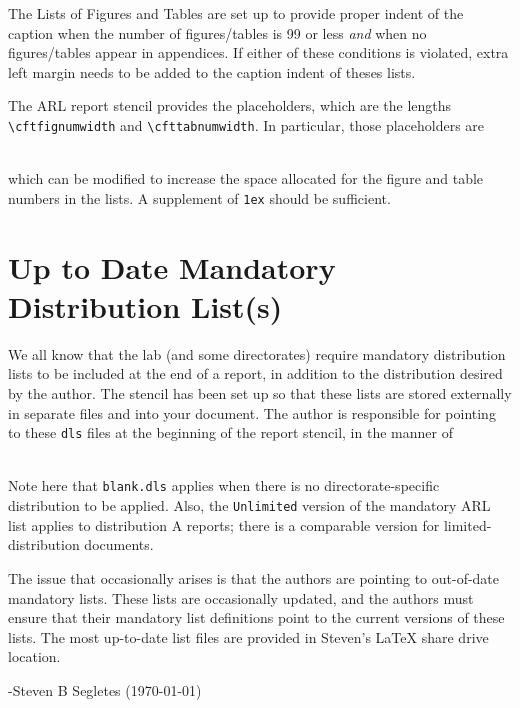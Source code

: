 \documentclass{arlticle}
\begin{document}
The Lists of Figures and Tables are set up to provide proper indent of the caption
  when the number of figures/tables is 99 or less \textit{and} when no 
  figures/tables appear in appendices.
If either of these conditions is violated, extra left margin needs to be added to
  the caption indent of theses lists.

\begin{sloppypar}
The ARL report stencil provides the placeholders, which are the lengths
\verb|\cftfignumwidth| and \verb|\cfttabnumwidth|.
In particular, those placeholders are
\end{sloppypar}
\begin{verbbox}[\footnotesize]
  \addtolength{\cftfignumwidth}{0.0ex}
  \addtolength{\cfttabnumwidth}{0.0ex}
\end{verbbox}
\theverbbox\\
which can be modified to increase the space allocated for the figure and table
  numbers in the lists.
A supplement of \texttt{1ex} should be sufficient.

\section{Up to Date Mandatory Distribution List(s)}

We all know that the lab (and some directorates) require mandatory distribution
  lists to be included at the end of a report, in addition to the distribution
  desired by the author.
The stencil has been set up so that these lists are stored externally in
  separate files and \verb|| into your document.
The author is responsible for pointing to these \texttt{dls} files at the
  beginning of the report stencil, in the manner of

\begin{verbbox}[\footnotesize]
  \def\MandatoryDL{ARL-02-01-19(Unlimited).dls}
  \def\LocalMandatoryDL{blank.dls}
  \def\UserDL{ARLstencil.dls}
\end{verbbox}
\theverbbox\\
Note here that \texttt{blank.dls} applies when there is no directorate-specific
  distribution to be applied. 
Also, the \texttt{Unlimited} version of the mandatory ARL list applies to
  distribution A reports; there is a comparable version for limited-distribution
  documents.

The issue that occasionally arises is that the authors are pointing to 
  out-of-date mandatory lists.
These lists are occasionally updated, and the authors must ensure that
  their mandatory list definitions point to the current versions of these
  lists.
The most up-to-date list files are provided in Steven's \LaTeX{} share drive
  location.

\hfill -Steven B Segletes (\today)
\end{document}
